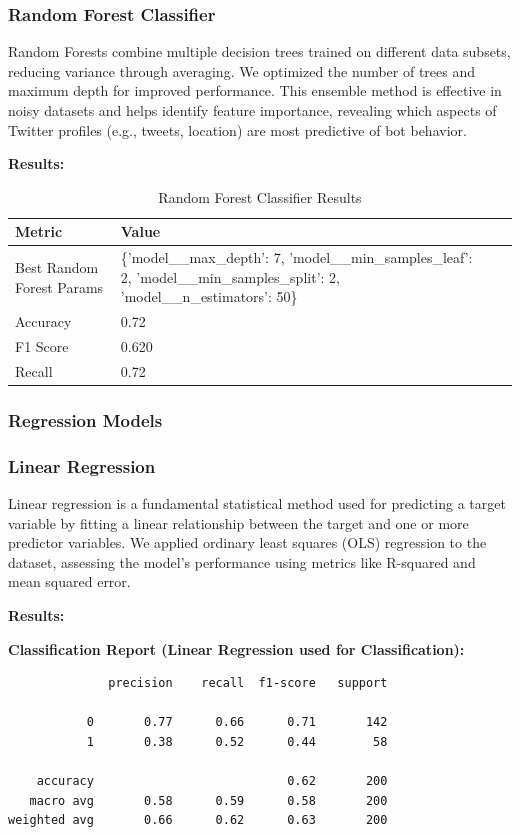 \documentclass[a4paper,11pt]{article}
\begin{document}
\subsubsection*{Random Forest Classifier}
Random Forests combine multiple decision trees trained on different data subsets, reducing variance through averaging. We optimized the number of trees and maximum depth for improved performance. This ensemble method is effective in noisy datasets and helps identify feature importance, revealing which aspects of Twitter profiles (e.g., tweets, location) are most predictive of bot behavior.

\textbf{Results:}
\begin{table}[h]
    \centering
    \begin{tabular}{|l|l|l|l|}
        \hline
        \textbf{Metric} & \textbf{Value} \\
        \hline
        Best Random Forest Params & \{'model\_\_max\_depth': 7, 'model\_\_min\_samples\_leaf': 2, 'model\_\_min\_samples\_split': 2, 'model\_\_n\_estimators': 50\} \\
        Accuracy & 0.72 \\
        F1 Score & 0.620 \\
        Recall & 0.72 \\
        \hline
    \end{tabular}
    \caption{Random Forest Classifier Results}
\end{table}


\subsubsection*{Regression Models}

\subsubsection*{Linear Regression}
Linear regression is a fundamental statistical method used for predicting a target variable by fitting a linear relationship between the target and one or more predictor variables. We applied ordinary least squares (OLS) regression to the dataset, assessing the model's performance using metrics like R-squared and mean squared error.

\textbf{Results:}

\textbf{Classification Report (Linear Regression used for Classification):}
\begin{verbatim}
              precision    recall  f1-score   support

           0       0.77      0.66      0.71       142
           1       0.38      0.52      0.44        58

    accuracy                           0.62       200
   macro avg       0.58      0.59      0.58       200
weighted avg       0.66      0.62      0.63       200
\end{verbatim}
\end{document}
